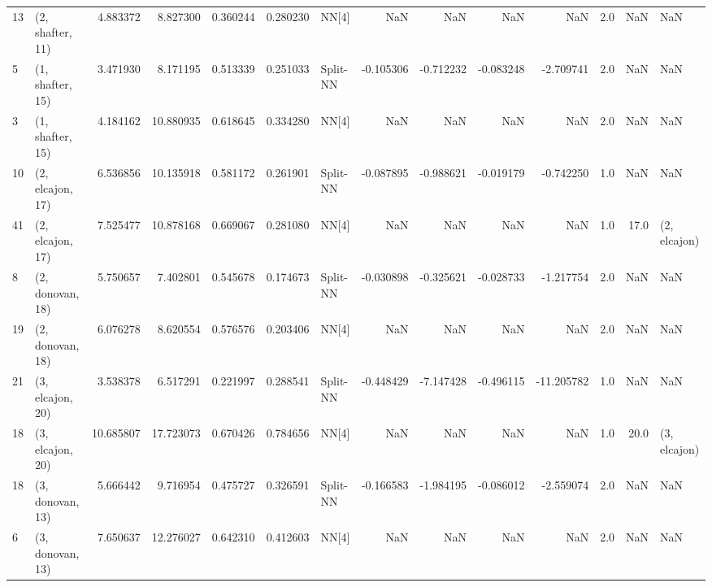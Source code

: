 \begin{tabular}{llrrrrlrrrrrrl}
13 &  (2, shafter, 11) &   4.883372 &   8.827300 &   0.360244 &  0.280230 &       NN[4] &             NaN &           NaN &            NaN &          NaN &            2.0 &    NaN &              NaN \\
5  &  (1, shafter, 15) &   3.471930 &   8.171195 &   0.513339 &  0.251033 &    Split-NN &       -0.105306 &     -0.712232 &      -0.083248 &    -2.709741 &            2.0 &    NaN &              NaN \\
3  &  (1, shafter, 15) &   4.184162 &  10.880935 &   0.618645 &  0.334280 &       NN[4] &             NaN &           NaN &            NaN &          NaN &            2.0 &    NaN &              NaN \\
10 &  (2, elcajon, 17) &   6.536856 &  10.135918 &   0.581172 &  0.261901 &    Split-NN &       -0.087895 &     -0.988621 &      -0.019179 &    -0.742250 &            1.0 &    NaN &              NaN \\
41 &  (2, elcajon, 17) &   7.525477 &  10.878168 &   0.669067 &  0.281080 &       NN[4] &             NaN &           NaN &            NaN &          NaN &            1.0 &   17.0 &     (2, elcajon) \\
8  &  (2, donovan, 18) &   5.750657 &   7.402801 &   0.545678 &  0.174673 &    Split-NN &       -0.030898 &     -0.325621 &      -0.028733 &    -1.217754 &            2.0 &    NaN &              NaN \\
19 &  (2, donovan, 18) &   6.076278 &   8.620554 &   0.576576 &  0.203406 &       NN[4] &             NaN &           NaN &            NaN &          NaN &            2.0 &    NaN &              NaN \\
21 &  (3, elcajon, 20) &   3.538378 &   6.517291 &   0.221997 &  0.288541 &    Split-NN &       -0.448429 &     -7.147428 &      -0.496115 &   -11.205782 &            1.0 &    NaN &              NaN \\
18 &  (3, elcajon, 20) &  10.685807 &  17.723073 &   0.670426 &  0.784656 &       NN[4] &             NaN &           NaN &            NaN &          NaN &            1.0 &   20.0 &     (3, elcajon) \\
18 &  (3, donovan, 13) &   5.666442 &   9.716954 &   0.475727 &  0.326591 &    Split-NN &       -0.166583 &     -1.984195 &      -0.086012 &    -2.559074 &            2.0 &    NaN &              NaN \\
6  &  (3, donovan, 13) &   7.650637 &  12.276027 &   0.642310 &  0.412603 &       NN[4] &             NaN &           NaN &            NaN &          NaN &            2.0 &    NaN &              NaN \\

\end{tabular}
